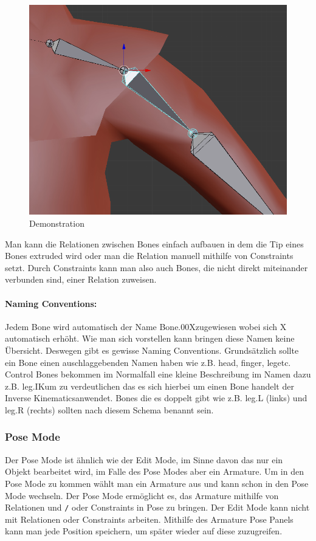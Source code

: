 \begin{figure}[H]
    \centering

    \includegraphics[width=.8\textwidth]{images/bone_parent_child_demonstration.png}
    \caption{Demonstration}
\end{figure}

Man kann die Relationen zwischen Bones einfach aufbauen in dem die Tip eines Bones extruded wird oder man die Relation manuell mithilfe von Constraints setzt.
Durch Constraints kann man also auch Bones, die nicht direkt miteinander verbunden sind, einer Relation zuweisen.

\paragraph{Naming Conventions:}
Jedem Bone wird automatisch der Name \dq Bone.00X\dq zugewiesen wobei sich X automatisch erhöht. Wie man sich vorstellen kann bringen diese Namen keine Übersicht.
Deswegen gibt es gewisse Naming Conventions. Grundsätzlich sollte ein Bone einen auschlaggebenden Namen haben wie z.B. \dq head\dq, \dq finger\dq, \dq leg\dq  etc.
Control Bones bekommen im Normalfall eine kleine Beschreibung im Namen dazu z.B. \dq leg.IK\dq um zu verdeutlichen das es sich hierbei um einen Bone handelt der \dq Inverse Kinematics\dq anwendet.
Bones die es doppelt gibt wie z.B. leg.L (links) und leg.R (rechts) sollten nach diesem Schema benannt sein.

\subsubsection{Pose Mode}
Der Pose Mode ist ähnlich wie der Edit Mode, im Sinne davon das nur ein Objekt bearbeitet wird, im Falle des Pose Modes aber ein Armature.
Um in den Pose Mode zu kommen wählt man ein Armature aus und kann schon in den Pose Mode wechseln.
Der Pose Mode ermöglicht es, das Armature mithilfe von Relationen und \verb-/- oder Constraints in Pose zu bringen. Der Edit Mode kann nicht mit Relationen oder Constraints arbeiten.
Mithilfe des Armature Pose Panels kann man jede Position speichern, um später wieder auf diese zuzugreifen.

